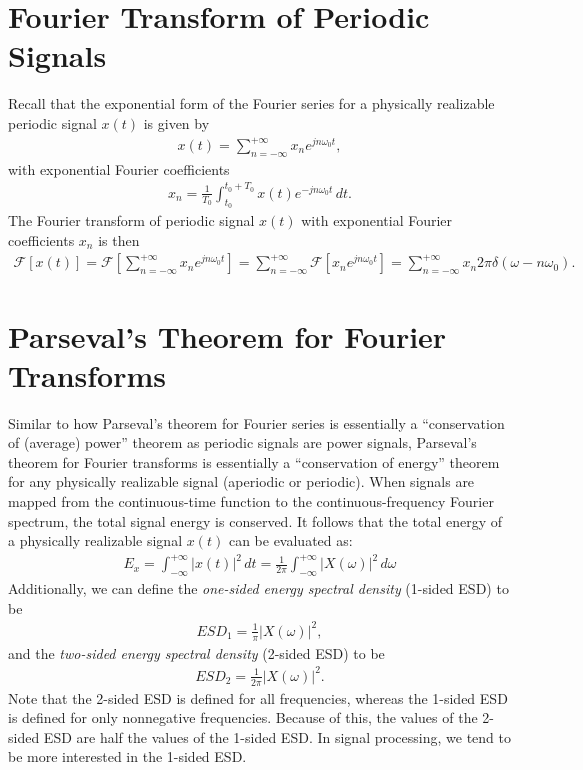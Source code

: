 \documentclass{report}
\begin{document}
\section{Fourier Transform of Periodic Signals}
Recall that the exponential form of the Fourier series for a physically realizable periodic signal $x(t)$ is given by 
\begin{align}
    x(t) = \sum_{n=-\infty}^{+\infty} x_n e^{jn\omega_0 t},
\end{align}
with exponential Fourier coefficients
\begin{align}
    x_n = \frac{1}{T_0} \int_{t_0}^{t_0+T_0} x(t) e^{-jn\omega_0 t} \,dt.
\end{align}
The Fourier transform of periodic signal $x(t)$ with exponential Fourier coefficients $x_n$ is then 
\begin{align}
    \mathcal{F}[x(t)] = \mathcal{F}\left[\sum_{n=-\infty}^{+\infty} x_n e^{jn\omega_0 t}\right] = \sum_{n=-\infty}^{+\infty} \mathcal{F}[x_n e^{jn\omega_0 t}] = \sum_{n=-\infty}^{+\infty} x_n 2\pi \delta(\omega - n\omega_0).
\end{align}

\section{Parseval's Theorem for Fourier Transforms}
Similar to how Parseval's theorem for Fourier series is essentially a ``conservation of (average) power'' theorem as periodic signals are power signals, 
Parseval's theorem for Fourier transforms is essentially a ``conservation of energy'' theorem for any physically realizable signal (aperiodic or periodic). 
When signals are mapped from the continuous-time function to the continuous-frequency Fourier spectrum, the total signal energy is conserved. It follows that 
the total energy of a physically realizable signal $x(t)$ can be evaluated as:
\begin{align}
    E_x = \int_{-\infty}^{+\infty} |x(t)|^2 \,dt = \frac{1}{2\pi}\int_{-\infty}^{+\infty} |X(\omega)|^2 \,d\omega
\end{align}
Additionally, we can define the \emph{one-sided energy spectral density} (1-sided ESD) to be 
\begin{align}
    ESD_1 = \frac{1}{\pi}|X(\omega)|^2,
\end{align}
and the \emph{two-sided energy spectral density} (2-sided ESD) to be 
\begin{align}
    ESD_2 = \frac{1}{2\pi}|X(\omega)|^2.
\end{align}
Note that the 2-sided ESD is defined for all frequencies, whereas the 1-sided ESD is defined for only nonnegative frequencies. 
Because of this, the values of the 2-sided ESD are half the values of the 1-sided ESD. In signal processing, we tend to be more interested in the 1-sided ESD.
\end{document}
